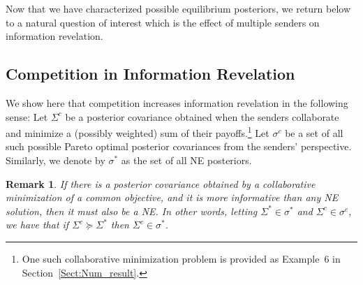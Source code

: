 \documentclass[12pt,journal,onecolumn]{IEEEtran}
\newtheorem{remark}{Remark}
\begin{document}
 Now that we have characterized possible equilibrium posteriors, we return below to a natural question of interest %
which is the effect of multiple senders on information revelation. %
\subsection{Competition in Information Revelation}
We show here that competition increases information revelation in the following sense: Let $\Sigma^c$ be a posterior covariance obtained when the senders collaborate and minimize a (possibly weighted) sum of their payoffs.\footnote{One such collaborative minimization problem is provided as Example~6 in Section~\ref{Sect:Num_result}.} Let $\sigma^c$ be a set of all such possible Pareto optimal posterior covariances from the senders' perspective. Similarly, we denote by $\sigma^*$ as the set of all NE posteriors.
\begin{remark} If there is a posterior covariance %
obtained by a collaborative minimization of a common objective, and it is more informative than any NE solution, then it must also be a NE. In other words, letting $\Sigma^*\in\sigma^*$ and $\Sigma^c\in\sigma^c$, we have that if $\Sigma^c\succeq\Sigma^*$ then $\Sigma^c\in\sigma^*$.
\end{remark}
\end{document}
